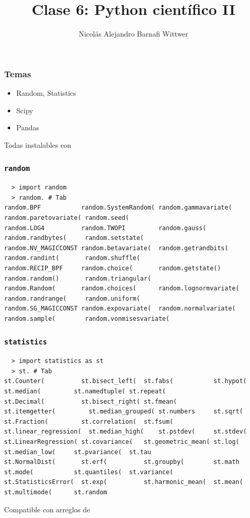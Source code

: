 \documentclass[14pt,aspectratio=169,xcolor=dvipsnames]{beamer}
\title[short title]{Clase 6: Python científico II}
\subtitle{}
\author[NA Barnafi] {Nicolás Alejandro Barnafi Wittwer}
\institute[UC|CMM] 
{
    Pontificia Universidad Católica de Chile \\
    Centro de Modelamiento Matemático
}
\date{}
\begin{document}
\begin{frame}
    \maketitle
\end{frame}
\begin{frame}\frametitle{Temas}
    \begin{itemize}
        \item Random, Statistics
        \item Scipy
        \item Pandas
    \end{itemize}

    \vspace{1cm}
    Todas instalables con 
\end{frame}
\begin{frame}[fragile]\frametitle{\texttt{random}}
    \begin{verbatim}
  > import random
  > random. # Tab
random.BPF           random.SystemRandom( random.gammavariate(   random.paretovariate( random.seed(           
random.LOG4          random.TWOPI         random.gauss(          random.randbytes(     random.setstate(         
random.NV_MAGICCONST random.betavariate(  random.getrandbits(    random.randint(       random.shuffle(          
random.RECIP_BPF     random.choice(       random.getstate()      random.random()       random.triangular(       
random.Random(       random.choices(      random.lognormvariate( random.randrange(     random.uniform(          
random.SG_MAGICCONST random.expovariate(  random.normalvariate(  random.sample(        random.vonmisesvariate( 
    \end{verbatim}
    
\end{frame}
\begin{frame}[fragile]\frametitle{\texttt{statistics}}
    \begin{verbatim}
  > import statistics as st
  > st. # Tab
st.Counter(          st.bisect_left(  st.fabs(           st.hypot(              st.median(         st.namedtuple( st.repeat(
st.Decimal(          st.bisect_right( st.fmean(          st.itemgetter(         st.median_grouped( st.numbers     st.sqrt(
st.Fraction(         st.correlation(  st.fsum(           st.linear_regression(  st.median_high(    st.pstdev(     st.stdev(
st.LinearRegression( st.covariance(   st.geometric_mean( st.log(                st.median_low(     st.pvariance(  st.tau
st.NormalDist(       st.erf(          st.groupby(        st.math                st.mode(           st.quantiles(  st.variance(
st.StatisticsError(  st.exp(          st.harmonic_mean(  st.mean(               st.multimode(      st.random      
    \end{verbatim}
    Compatible con arreglos de  
\end{frame}
\end{document}
